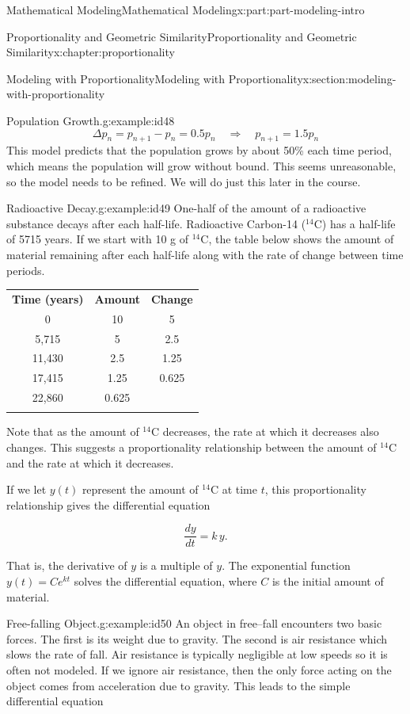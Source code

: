 \documentclass[oneside,10pt,]{book}
\newcommand{\tabularfont}{\relax}
\numberwithin{equation}{section}
\newcommand{\hrulethin}  {\noalign{\hrule height 0.04em}}
\newcommand{\hrulethick} {\noalign{\hrule height 0.11em}}
\begin{document}
\begin{partptx}{Mathematical Modeling}{}{Mathematical Modeling}{}{}{x:part:part-modeling-intro}
\begin{chapterptx}{Proportionality and Geometric Similarity}{}{Proportionality and Geometric Similarity}{}{}{x:chapter:proportionality}
\begin{sectionptx}{Modeling with Proportionality}{}{Modeling with Proportionality}{}{}{x:section:modeling-with-proportionality}
\begin{example}{Population Growth.}{g:example:id48}
%
\begin{equation*}
\Delta p_{n} = p_{n+1} - p_{n} = 0.5p_n \quad \Longrightarrow \quad p_{n+1} = 1.5p_n
\end{equation*}
This model predicts that the population grows by about 50\% each time period, which means the population will grow without bound. This seems unreasonable, so the model needs to be refined. We will do just this later in the course.%
\end{example}
\begin{example}{Radioactive Decay.}{g:example:id49}%
One-half of the amount of a radioactive substance decays after each half-life. Radioactive Carbon-14 (\({}^{14}\)C) has a half-life of 5715 years. If we start with 10 g of \({}^{14}\)C, the table below shows the amount of material remaining after each half-life along with the rate of change between time periods.%
\begin{center}%
{\tabularfont%
\begin{tabular}{ccc}\hrulethick
\textbf{Time (years)}&\textbf{Amount}&\textbf{Change}\tabularnewline\hrulethin
0&10&5\tabularnewline[0pt]
5,715&5&2.5\tabularnewline[0pt]
11,430&2.5&1.25\tabularnewline[0pt]
17,415&1.25&0.625\tabularnewline[0pt]
22,860&0.625&\tabularnewline\hrulethick
\end{tabular}
}%
\end{center}%
Note that as the amount of \({}^{14}\)C decreases, the rate at which it decreases also changes. This suggests a proportionality relationship between the amount of \({}^{14}\)C and the rate at which it decreases.%
\par
If we let \(y(t)\) represent the amount of \({}^{14}\)C at time \(t\), this proportionality relationship gives the differential equation%
\par
%
\begin{equation*}
\frac{dy}{dt} = k\,y.
\end{equation*}
%
\par
That is, the derivative of \(y\) is a multiple of \(y\). The exponential function \(y(t) = Ce^{kt}\) solves the differential equation, where \(C\) is the initial amount of material.%
\end{example}
\begin{example}{Free-falling Object.}{g:example:id50}%
An object in free–fall encounters two basic forces. The first is its weight due to gravity. The second is air resistance which slows the rate of fall. Air resistance is typically negligible at low speeds so it is often not modeled. If we ignore air resistance, then the only force acting on the object comes from acceleration due to gravity. This leads to the simple differential equation%

\end{example}
\end{sectionptx}
\end{chapterptx}
\end{partptx}
\end{document}
